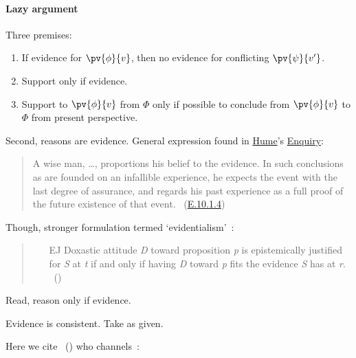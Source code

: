 \paragraph{Lazy argument}

\begin{note}
  Three premises:
  \begin{enumerate}
  \item
    \label{lazy:evidence-constraint}
    If evidence for \(\pv{\phi}{v}\), then no evidence for conflicting \(\pv{\psi}{v'}\).
  \item
    \label{lazy:evidence}
    Support only if evidence.
  \item
    \label{lazy:reason}
    Support to \(\pv{\phi}{v}\) from \(\Phi\) only if possible to conclude from \(\pv{\phi}{v}\) to \(\Phi\) from present perspective.
  \end{enumerate}

    Second, reasons are evidence.
  General expression found in \hyperlink{cite.Hume:1748tp}{Hume}'s \hyperlink{cite.Hume:1748tp}{Enquiry}:
  \begin{quote}
    A wise man, \dots, proportions his belief to the evidence.
    In such conclusions as are founded on an infallible experience, he expects the event with the last degree of assurance, and regards his past experience as a full proof of the future existence of that event.%
    \mbox{ }\hfill\mbox{(\hyperlink{cite.Hume:1748tp}{E.10.1.4})}
  \end{quote}

  Though, stronger formulation termed `evidentialism'~\citeauthor{Feldman:1985wx}:

  \begin{quote}
    \begin{enumerate}
    \item[EJ] Doxastic attitude \emph{D} toward proposition \emph{p} is epistemically justified for \emph{S} at \emph{t} if and only if having \emph{D} toward \emph{p} fits the evidence \emph{S} has at \emph{r}.%
      \mbox{ }\hfill\mbox{(\citeyear[15]{Feldman:1985wx})}
    \end{enumerate}
  \end{quote}

  Read, reason only if evidence.

  Evidence is consistent.
  Take as given.

  Here we cite~\citeauthor{Achinstein:2001ub} (\citeauthor{Achinstein:2001ub}) who channels~\textcite{Carnap:1962ue}:


\end{note}
